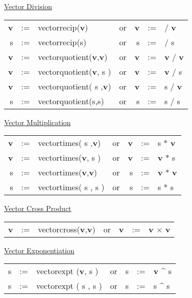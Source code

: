 \underline{Vector Division}\\
  
\begin{tabular}{rclcrcl}
\textbf{v} &:=& vectorrecip(\textbf{v})  &{\rm or}& \textbf{v} &:=&  /  
\textbf{v} \\
 s  &:=& vectorrecip(s)  &{\rm or} &      s  &:=&  /       s  \\
\textbf{v} &:=& vectorquotient(\textbf{v},\textbf{v})  &{\rm or }& \textbf{v} &:=&  
\textbf{v} /  \textbf{v} \\
\textbf{v} &:=& vectorquotient(\textbf{v},    s  )  &{\rm or }& \textbf{v} &:=&  
\textbf{v} /     s    \\
\textbf{v} &:=& vectorquotient(   s   ,\textbf{v})  &{\rm or }& \textbf{v} &:=&  
   s    /  \textbf{v} \\
     s  &:=& vectorquotient(s,s)  &{\rm or }&      s  &:=&  s / s       
       
\end{tabular}

\underline{Vector Multiplication}\\ 
 
\begin{tabular}{rclcrcl}
\textbf{v} &:=& vectortimes(   s   ,\textbf{v})  &{\rm or }& \textbf{v} &:=&     
s    *  \textbf{v} \\
\textbf{v} &:=& vectortimes(\textbf{v},   s   )  &{\rm or }& \textbf{v} &:=& {\bf
 v}  *     s    \\
   s    &:=& vectortimes(\textbf{v},\textbf{v})  &{\rm or }&    s    &:=& {\bf
 v}  *  \textbf{v} \\
   s    &:=& vectortimes(   s   ,   s   )  &{\rm or }&    s    &:=&     
s    *     s    
\end{tabular}
 
\underline{Vector Cross Product} \\
  
\begin{tabular}{rclcrcl}
\textbf{v} &:=& vectorcross(\textbf{v},\textbf{v})  &{\rm or }& \textbf{v} &:=& {\bf
 v} $\times$   \textbf{v} 
\end{tabular}
 
\underline{Vector Exponentiation}\\
 
\begin{tabular}{rclcrcl}
   s    &:=& vectorexpt (\textbf{v},   s   )  &{\rm or }&    s    &:=& {\bf
 v}  \^{} s   \\
   s    &:=& vectorexpt (   s   ,   s   )  &{\rm or }&    s    &:=&    s
     \^{} s   
\end{tabular}

